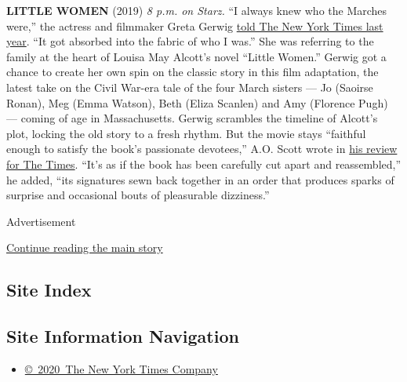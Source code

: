 \textbf{LITTLE WOMEN} (2019) \emph{8 p.m. on Starz.} ``I always knew who
the Marches were,'' the actress and filmmaker Greta Gerwig
\href{https://www.nytimes3xbfgragh.onion/2019/12/23/movies/little-women-review.html}{told
The New York Times last year}. ``It got absorbed into the fabric of who
I was.'' She was referring to the family at the heart of Louisa May
Alcott's novel ``Little Women.'' Gerwig got a chance to create her own
spin on the classic story in this film adaptation, the latest take on
the Civil War-era tale of the four March sisters --- Jo (Saoirse Ronan),
Meg (Emma Watson), Beth (Eliza Scanlen) and Amy (Florence Pugh) ---
coming of age in Massachusetts. Gerwig scrambles the timeline of
Alcott's plot, locking the old story to a fresh rhythm. But the movie
stays ``faithful enough to satisfy the book's passionate devotees,''
A.O. Scott wrote in
\href{https://www.nytimes3xbfgragh.onion/2019/12/23/movies/little-women-review.html}{his
review for The Times}. ``It's as if the book has been carefully cut
apart and reassembled,'' he added, ``its signatures sewn back together
in an order that produces sparks of surprise and occasional bouts of
pleasurable dizziness.''

Advertisement

\protect\hyperlink{after-bottom}{Continue reading the main story}

\hypertarget{site-index}{%
\subsection{Site Index}\label{site-index}}

\hypertarget{site-information-navigation}{%
\subsection{Site Information
Navigation}\label{site-information-navigation}}

\begin{itemize}
\tightlist
\item
  \href{https://help.nytimes3xbfgragh.onion/hc/en-us/articles/115014792127-Copyright-notice}{©~2020~The
  New York Times Company}
\end{itemize}

